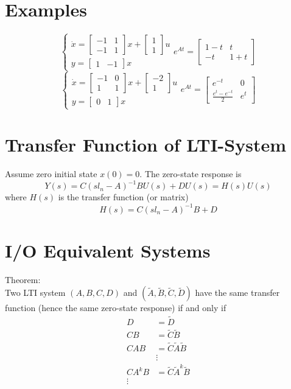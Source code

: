 \documentclass[10pt,a4paper,oneside]{article}
\begin{document}
\section{Examples}
\[
\left\{\begin{array}{l}{\dot{x}=\left[\begin{array}{cc}{-1} & {1} \\ {-1} & {1}\end{array}\right] x+\left[\begin{array}{l}{1} \\ {1}\end{array}\right] u} \\ {y=\left[\begin{array}{cc}{1} & {-1}\end{array}\right] x}\end{array}\right.
e^{A t}=\left[\begin{array}{cc}{1-t} & {t} \\ {-t} & {1+t}\end{array}\right]
\]
\[
\left\{\begin{array}{l}{\dot{x}=\left[\begin{array}{cc}{-1} & {0} \\ {1} & {1}\end{array}\right] x+\left[\begin{array}{c}{-2} \\ {1}\end{array}\right] u} \\ {y=\left[\begin{array}{ll}{0} & {1}\end{array}\right] x}\end{array}\right.
e^{A t}=\left[\begin{array}{cc}{e^{-t}} & {0} \\ {\frac{e^{t}-e^{-t}}{2}} & {e^{t}}\end{array}\right]
\]
\section{Transfer Function of LTI-System}
Assume zero initial state $x(0)=0 .$ The zero-state response is
\[
Y(s)=C\left(s l_{n}-A\right)^{-1} B U(s)+D U(s)=H(s) U(s)
\]
where $H(s)$ is the transfer function (or matrix)
\[
H(s)=C\left(s l_{n}-A\right)^{-1} B+D
\]
\section{I/O Equivalent Systems}
Theorem:\\
Two LTI  system $(A,B,C,D)$ and $(\tilde{A}, \tilde{B}, \tilde{C}, \tilde{D})$ have the same transfer function (hence the same zero-state response) if and only if
\[
\begin{aligned} D &=\tilde{D} \\ C B &=\tilde{C} \tilde{B} \\ C A B &=\tilde{C} \tilde{A} \tilde{B} \\ & \vdots \\ C A^{k} B &=\tilde{C} \tilde{A}^{k} \tilde{B} \\\vdots\end{aligned}
\]
\end{document}
